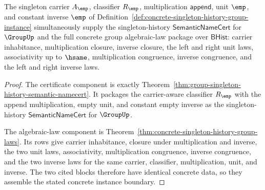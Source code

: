 \begin{theorem}
\label{thm:group-singleton-compiled-concrete-instance-boundary}
The singleton carrier $A_{\emp}$, classifier $R_{\emp}$, multiplication
$\mathsf{append}$, unit $\emp$, and constant inverse $\emp$ of
Definition~\ref{def:concrete-singleton-history-group-instance} simultaneously
supply the singleton-history $\mathsf{SemanticNameCert}$ for $\GroupUp$ and
the full concrete group algebraic-law package over $\mathsf{BHist}$:
carrier inhabitance, multiplication closure, inverse closure, the left and
right unit laws, associativity up to $\hsame$, multiplication congruence,
inverse congruence, and the left and right inverse laws.
\end{theorem}
\begin{proof}
The certificate component is exactly
Theorem~\ref{thm:group-singleton-history-semantic-namecert}. It packages the
carrier-aware classifier $R_{\emp}$ with the append multiplication, empty unit,
and constant empty inverse as the singleton-history
$\mathsf{SemanticNameCert}$ for $\GroupUp$.

The algebraic-law component is
Theorem~\ref{thm:concrete-singleton-history-group-laws}. Its rows give carrier
inhabitance, closure under multiplication and inverse, the two unit laws,
associativity, multiplication congruence, inverse congruence, and the two
inverse laws for the same carrier, classifier, multiplication, unit, and
inverse. The two cited blocks therefore have identical concrete data, so they
assemble the stated concrete instance boundary.
\end{proof}


